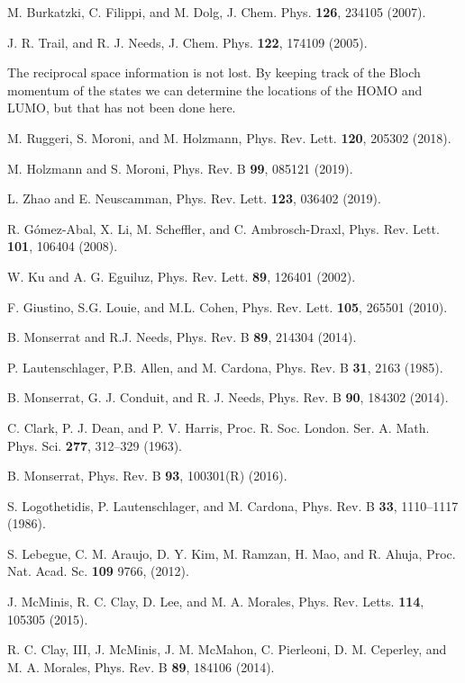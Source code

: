 \begin{thebibliography}{99}
 M. Burkatzki, C. Filippi,  and M. Dolg, J. Chem. Phys. {\bf126}, 234105 (2007).

 J. R. Trail, and R. J. Needs, J. Chem. Phys. {\bf122}, 174109 (2005).

 The reciprocal space information is not lost. By keeping track of the
Bloch momentum of the states we can determine the locations of the HOMO and LUMO, but that has not been done here.

 M. Ruggeri, S. Moroni, and M. Holzmann,
Phys. Rev. Lett. {\bf 120}, 205302 (2018).

 M. Holzmann and S. Moroni,
Phys. Rev. B {\bf 99}, 085121 (2019).

 L. Zhao and E. Neuscamman,
Phys. Rev. Lett. {\bf 123}, 036402 (2019).

 R. G{\'o}mez-Abal, X. Li, M. Scheffler, and C. Ambrosch-Draxl, Phys. Rev. Lett. {\bf 101}, 106404 (2008).

 W. Ku and A. G. Eguiluz, Phys. Rev. Lett. {\bf 89}, 126401 (2002).

 F. Giustino, S.G. Louie, and M.L. Cohen, Phys. Rev. Lett. {\bf 105}, 265501 (2010).

 B. Monserrat and R.J. Needs, Phys. Rev. B {\bf 89}, 214304 (2014).

 P. Lautenschlager, P.B. Allen, and M. Cardona, Phys. Rev. B {\bf 31},
2163 (1985).

 B. Monserrat, G. J. Conduit, and R. J. Needs, Phys. Rev. B {\bf 90}, 184302 (2014).

 C. Clark, P. J. Dean, and P. V. Harris, Proc. R. Soc. London. Ser. A. Math. Phys. Sci. {\bf 277}, 312--329 (1963).

 B. Monserrat, Phys. Rev. B {\bf 93}, 100301(R) (2016).

 S. Logothetidis, P. Lautenschlager, and M. Cardona, Phys. Rev. B {\bf 33}, 1110--1117 (1986).

 S. Lebegue, C. M. Araujo, D. Y. Kim, M. Ramzan, H. Mao, and R. Ahuja,  Proc. Nat. Acad. Sc. {\bf 109} 9766, (2012).

 J. McMinis, R. C. Clay, D. Lee, and M. A. Morales, Phys. Rev. Letts. {\bf 114}, 105305 (2015).

 R. C. Clay, III, J. McMinis, J. M. McMahon, C. Pierleoni, D. M. Ceperley, and M. A. Morales, Phys. Rev. B {\bf89}, 184106 (2014).


\end{thebibliography}
